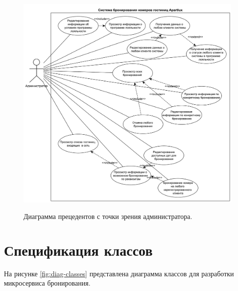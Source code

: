 \begin{figure}[h!]
	\begin{center}
		{\includegraphics[scale = 0.54]{img/use-case/admin.pdf}}
		\caption{Диаграмма прецедентов с точки зрения администратора.}
		\label{fig:use-case-admin}
	\end{center}
\end{figure}

\pagebreak

\section*{Спецификация классов}
На рисунке \ref{fig:diag-classes} представлена диаграмма классов для разработки микросервиса бронирования.

